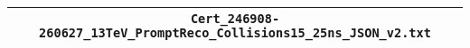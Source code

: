 \begin{center}
\begin{tabular}{c}
\hline\hline
\verb!Cert_246908-260627_13TeV_PromptReco_Collisions15_25ns_JSON_v2.txt!\tabularnewline
\hline
\end{tabular}\end{center}
